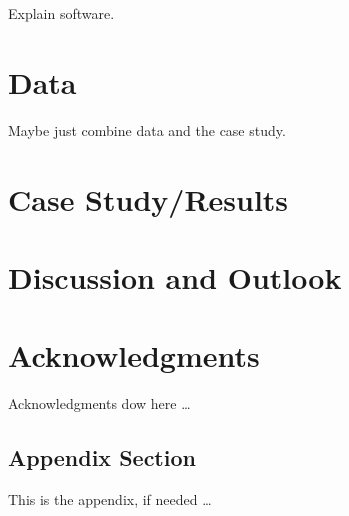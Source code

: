 \documentclass[article,nojss,shortnames]{jss}
\begin{document}
Explain software.


\section{Data}

Maybe just combine data and the case study.

\section{Case Study/Results}


\section{Discussion and Outlook}




\section*{Acknowledgments}

Acknowledgments dow here \dots


\newpage


\newpage

\begin{appendix}

\section{Appendix Section}

This is the appendix, if needed \dots

\end{appendix}
\end{document}
